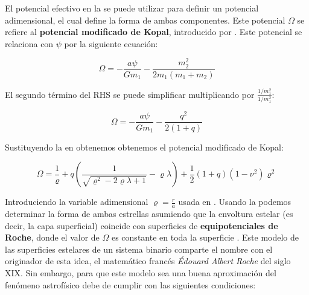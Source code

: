 El potencial efectivo en la  se
puede utilizar para definir un potencial adimensional, el cual define la forma
de ambas componentes. Este potencial $\Omega$ se refiere al \textbf{potencial
modificado de Kopal}, introducido por
. Este potencial se
relaciona con $\psi$ por la siguiente ecuación:

\begin{eqfloat}[!ht]
	\centering
	\begin{equation}
		\Omega = -\frac{a \psi}{G m_1} - \frac{m_2^2}{2m_1(m_1 + m_2)}
	\end{equation}
\end{eqfloat}

El segundo término del RHS se puede simplificar multiplicando por $\frac{1/m_1^2}{1/m_1^2}$:

\begin{eqfloat}[!ht]
	\centering
	\begin{equation}
		\Omega = -\frac{a \psi}{G m_1} - \frac{q^2}{2(1 + q)}
	\end{equation}
	\blankcaption
	\label{ecuacionRochePotencialEfectivo}
\end{eqfloat}

Sustituyendo la  en
 obtenemos obtenemos el potencial modificado
de Kopal:

\begin{eqfloat}[!ht]
	\centering
	\begin{equation}
		\Omega = \frac{1}{\varrho} + q\left(\frac{1}{\sqrt{\varrho^2 - 2\varrho \lambda + 1}} - \varrho \lambda \right) + \frac{1}{2} (1 + q)(1 - \nu^2)\varrho^2
	\end{equation}
	\blankcaption
	\label{ecuacionRoche}
\end{eqfloat}

Introduciendo la variable adimensional $\varrho = \frac{r}{a}$ usada en
. Usando la
 podemos determinar la forma de ambas estrellas
asumiendo que la envoltura estelar (es decir, la capa superficial) coincide con
superficies de \textbf{equipotenciales de Roche}, donde el valor de $\Omega$ es
constante en toda la superficie
. Este modelo de las
superficies estelares de un sistema binario comparte el nombre con el originador
de esta idea, el matemático francés \textit{Édouard Albert Roche} del siglo XIX.
Sin embargo, para que este modelo sea una buena aproximación del fenómeno
astrofísico debe de cumplir con las siguientes condiciones:

